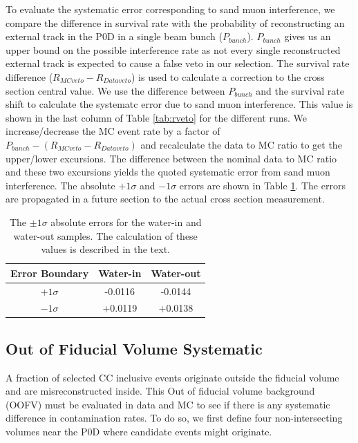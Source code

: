 To evaluate the systematic error corresponding to sand muon interference, we compare the difference in survival rate with the probability of reconstructing an external track in the P0D in a single beam bunch ($P_{bunch}$). $P_{bunch}$ gives us an upper bound on the possible interference rate as not every single reconstructed external track is expected to cause a false veto in our selection. The survival rate difference ($R_{MC veto} - R_{Data veto}$) is used to calculate a correction to the cross section central value. We use the difference between $P_{bunch}$ and the survival rate shift to calculate the systematc error due to sand muon interference. This value is shown in the last column of Table \ref{tab:rveto} for the different runs. We increase/decrease the MC event rate by a factor of $P_{bunch}-(R_{MC veto}-R_{Data veto})$ and recalculate the data to MC ratio to get the upper/lower excursions. The difference between the nominal data to MC ratio and these two excursions yields the quoted systematic error from sand muon interference. The absolute $+1\sigma$ and $-1\sigma$ errors are shown in Table \ref{tab:sanderr}. The errors are propagated in a future section to the actual cross section measurement. 

\begin{table}[h]
\caption{The $\pm 1\sigma$ absolute errors for the water-in and water-out samples. The calculation of these values is described in the text.}
\label{tab:sanderr}
\centering
\begin{tabular}{ccc}
\toprule
Error Boundary & Water-in & Water-out \\
\midrule
$+1 \sigma$ & -0.0116 & -0.0144 \\
$-1 \sigma$ & +0.0119 & +0.0138 \\
\bottomrule
\end{tabular}
\end{table}

\subsection{Out of Fiducial Volume Systematic}

A fraction of selected CC inclusive events originate outside the fiducial volume and are misreconstructed inside. This Out of fiducial volume background (OOFV) must be evaluated in data and MC to see if there is any systematic difference in contamination rates. To do so, we first define four non-intersecting volumes near the P0D where candidate events might originate. 

